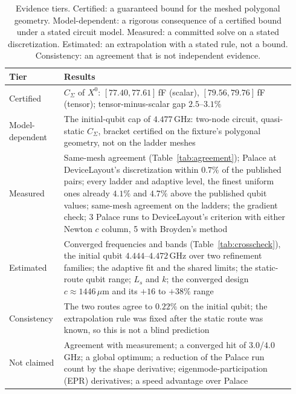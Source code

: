 \documentclass{anvil-paper}
\begin{document}
\begin{table}[htbp]
  \centering
  \caption{Evidence tiers. Certified: a guaranteed bound for the meshed
  polygonal geometry. Model-dependent: a rigorous consequence of a certified
  bound under a stated circuit model. Measured: a committed solve on a stated
  discretization. Estimated: an extrapolation with a stated rule, not a
  bound. Consistency: an agreement that is not independent evidence.}
  \label{tab:tiers}
  \footnotesize
  \begin{tabular}{@{}>{\raggedright\arraybackslash}p{0.17\linewidth}>{\raggedright\arraybackslash}p{0.77\linewidth}@{}}
    \toprule
    Tier & Results \\
    \midrule
    Certified & $C_\Sigma$ of $X^0$: $[77.40, 77.61]$\,fF (scalar), $[79.56, 79.76]$\,fF (tensor); tensor-minus-scalar gap $2.5$--$3.1\%$ \\
    Model-dependent & The initial-qubit cap of $4.477$\,GHz: two-node circuit, quasi-static $C_\Sigma$, bracket certified on the fixture's polygonal geometry, not on the ladder meshes \\
    Measured & Same-mesh agreement (Table~\ref{tab:agreement}); Palace at DeviceLayout's discretization within $0.7\%$ of the published pairs; every ladder and adaptive level, the finest uniform ones already $4.1\%$ and $4.7\%$ above the published qubit values; same-mesh agreement on the ladders; the gradient check; 3 Palace runs to DeviceLayout's criterion with either Newton $c$ column, 5 with Broyden's method \\
    Estimated & Converged frequencies and bands (Table~\ref{tab:crosscheck}), the initial qubit $4.444$--$4.472$\,GHz over two refinement families; the adaptive fit and the shared limits; the static-route qubit range; $L_s$ and $k$; the converged design $c \approx 1446\,\mu$m and its $+16$ to $+38\%$ range \\
    Consistency & The two routes agree to $0.22\%$ on the initial qubit; the extrapolation rule was fixed after the static route was known, so this is not a blind prediction \\
    Not claimed & Agreement with measurement; a converged hit of $3.0$/$4.0$\,GHz; a global optimum; a reduction of the Palace run count by the shape derivative; eigenmode-participation (EPR) derivatives; a speed advantage over Palace \\
    \bottomrule
  \end{tabular}
\end{table}
\end{document}
